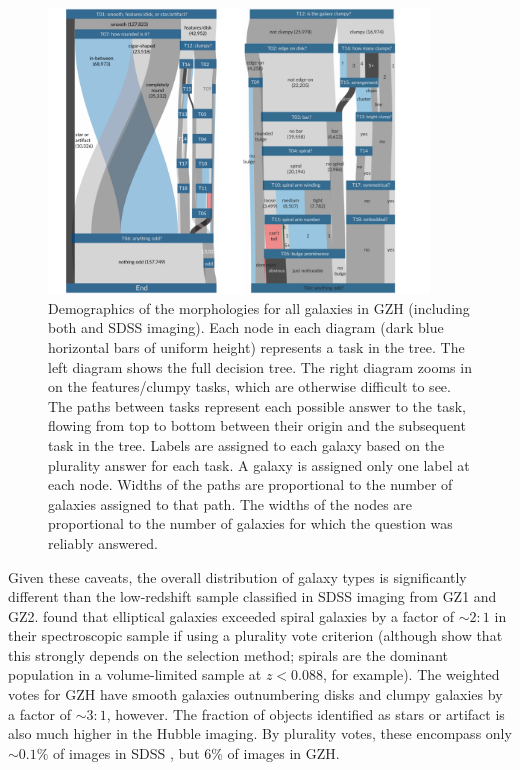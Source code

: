 \documentclass[twocolumn]{aastex6}
\begin{document}
\begin{figure}
\center
\includegraphics[width=0.90\textwidth]{figures/sankey_both.png}
\caption{Demographics of the morphologies for all galaxies in GZH (including
both \hst{} and SDSS imaging). Each node in each diagram (dark blue horizontal
bars of uniform height) represents a task in the tree. The left diagram shows
the full decision tree. The right diagram zooms in on the features/clumpy
tasks, which are otherwise difficult to see. The paths between tasks represent
each possible answer to the task, flowing from top to bottom between their
origin and the subsequent task in the tree. Labels are assigned to
each galaxy based on the plurality answer for each task. A galaxy is assigned
only one label at each node. Widths of the paths are proportional to the number
of galaxies assigned to that path. The widths of the nodes are proportional to
the number of galaxies for which the question was reliably answered.}
\label{fig:sankey}
\end{figure}

Given these caveats, the overall distribution of galaxy types is significantly
different than the low-redshift sample classified in SDSS imaging from GZ1 and
GZ2. \citet{lin11} found that elliptical galaxies exceeded spiral galaxies by a
factor of $\sim2:1$ in their spectroscopic sample if using a plurality vote
criterion (although \citealt{bam09} show that this strongly depends on the
selection method; spirals are the dominant population in a volume-limited
sample at $z<0.088$, for example). The weighted votes for GZH have smooth
galaxies outnumbering disks and clumpy galaxies by a factor of $\sim3:1$,
however. The fraction of objects identified as stars or artifact is also much
higher in the Hubble imaging. By plurality votes, these encompass only
$\sim0.1\%$ of images in SDSS \citep{wil13}, but 6\% of images in GZH. 
\end{document}
